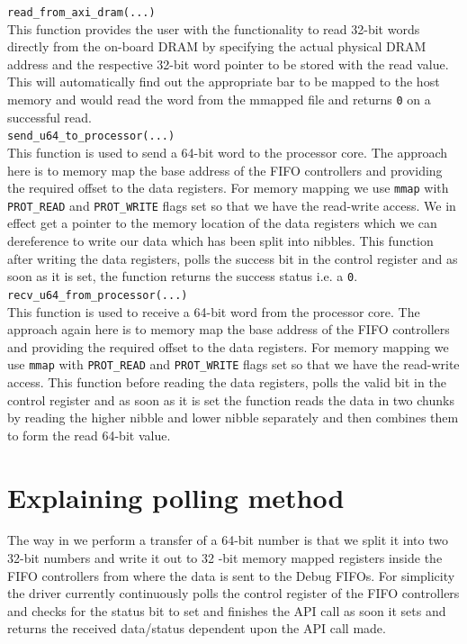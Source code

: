 \verb|read_from_axi_dram(...)|\\

This function provides the user with the functionality to read 32-bit words directly from the on-board DRAM by specifying the actual
physical DRAM address and the respective 32-bit word pointer to be stored with the read value. This will automatically find out the
appropriate bar to be mapped to the host memory and would read the word from the mmapped file and returns \verb|0| on a successful read.\\

\verb|send_u64_to_processor(...)| \\

This function is used to send a 64-bit word to the processor core. The approach here is to memory map the base address of the FIFO
controllers and providing the required offset to the data registers. For memory mapping we use \verb|mmap| with \verb|PROT_READ| and
\verb|PROT_WRITE| flags set so that we have the read-write access. We in effect get a pointer to the memory location of the data registers
which we can dereference to write our data which has been split into nibbles. This function after writing the data registers, polls the success bit in the
control register and as soon as it is set, the function returns the success status i.e. a \verb|0|. \\

 \verb|recv_u64_from_processor(...)| \\

This function is used to receive a 64-bit word from the processor core. The approach again here is to memory map the base address of the
FIFO controllers and providing the required offset to the data registers. For memory mapping we use \verb|mmap| with \verb|PROT_READ| and
\verb|PROT_WRITE| flags set so that we have the read-write access. This function before reading the data registers, polls the valid bit in
the control register and as soon as it is set the function reads the data in two chunks by reading the higher nibble and lower nibble
separately and then combines them to form the read 64-bit value.\\

\section{Explaining polling method}

The way in we perform a transfer of a 64-bit number is that we split it into two 32-bit numbers and write it out to 32 -bit memory mapped
registers inside the FIFO controllers from where the data is sent to the Debug FIFOs. For simplicity the driver currently continuously polls
the control register of the FIFO controllers and checks for the status bit to set and finishes the API call as soon it sets and returns the
received data/status dependent upon the API call made. 

